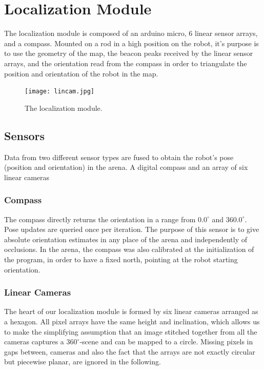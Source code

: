 %
%   
%

\chapter{Localization Module}
The localization module is composed of an arduino micro, 6 linear sensor arrays, and a compass. Mounted on a rod in a high position on the robot, it's purpose is to use the geometry of the map, the beacon peaks received by the linear sensor arrays, and the orientation read from the compass in order to triangulate the position and orientation of the robot in the map.

\begin{figure}
\centering
\texttt{[image: lincam.jpg]}
\caption{The localization module.}
\label{fig:lincam}
\end{figure}

\section{Sensors}
Data from two different sensor types are fused to obtain the robot's pose 
(position and orientation) in the arena. A digital compass and an array of
six linear cameras

\subsection{Compass}
The compass directly returns the orientation in a range from $0.0^\circ$ and $360.0^\circ$.
Pose updates are queried once per iteration. The purpose of this sensor is to 
give absolute orientation estimates in any place of the arena and independently of
occlusions. In the arena, the compass was also calibrated at the initialization of the program, in order to have a fixed north, pointing at the robot starting orientation.

\subsection{Linear Cameras}
The heart of our localization module is formed by six linear cameras arranged 
as a hexagon. All pixel arrays have the same height and inclination, which allows
us to make the simplifying assumption that an image stitched together from all the
cameras captures a $360^\circ$-scene and can be mapped to a circle. Missing pixels
in gaps between, cameras and also the fact that the arrays are not exactly circular
but piecewise planar, are ignored in the following.

